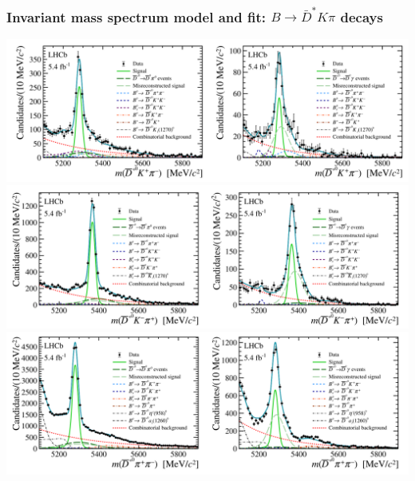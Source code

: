 \documentclass[10pt, aspectratio=169]{beamer}
\begin{document}
\begin{frame}[label=model-B2DKpi]%
  \frametitle{Invariant mass spectrum model and fit:
  $B\to \bar{D}^*K\pi$ decays}
  \centering

  \includegraphics[width=.7\textwidth]{figures/conf/B2DKpi-fig003-top}
  \includegraphics[width=.49\textwidth]{figures/conf/B2DKpi-fig003-mid}
  \includegraphics[width=.49\textwidth]{figures/conf/B2DKpi-fig003-bot}

\end{frame}%
\end{document}
